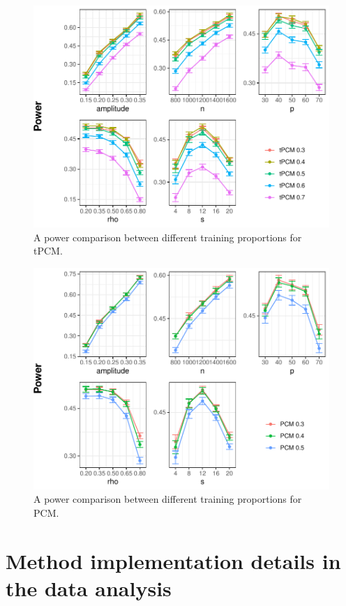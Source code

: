 \documentclass[12pt]{article}
\theoremstyle{definition}
\theoremstyle{remark}
\begin{document}
\begin{figure}
	\centering
	\includegraphics{figures/power_tPCM_choose_proportion.pdf}
	\caption{A power comparison between different training proportions for tPCM.}
	\label{fig:tPCM power proportion}
\end{figure}

\begin{figure}
	\centering
	\includegraphics{figures/power_PCM_choose_proportion.pdf}
	\caption{A power comparison between different training proportions for PCM.}
	\label{fig:PCM power proportion}
\end{figure}

\section{Method implementation details in the data analysis} \label{sec:data-analysis-details}
\end{document}

